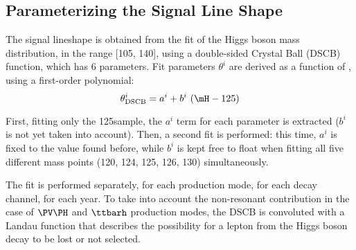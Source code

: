 \subsection{Parameterizing the Signal Line Shape}
\label{sec:SignalParametrization}
The signal lineshape is obtained from the fit of the Higgs boson mass distribution, 
in the range [105, 140]\GeV, using a double-sided Crystal Ball (DSCB) function, which has 6 parameters.
Fit parameters $\theta^i$ are derived as a function of \mH, using a first-order polynomial:
\[
\theta^{i}_\text{DSCB} = a^i + b^{i}~(\mH - 125)%
\]

First, fitting only the 125\GeV sample, the $a^i$ term for each parameter is extracted ($b^i$ is not yet taken into account).
Then, a second fit is performed:
this time, $a^i$ is fixed to the value found before, while $b^i$ is kept free to float when fitting all five different mass points (120, 124, 125, 126, 130\GeV) simultaneously.

The fit is performed separately, for each production mode, for each decay channel, for each year. 
To take into account the non-resonant contribution in the case of $\PV\PH$ and $\ttbarh$ production modes, the 
DSCB is convoluted with a Landau function that describes the possibility for a 
lepton from the Higgs boson decay to be lost or not selected.\\
